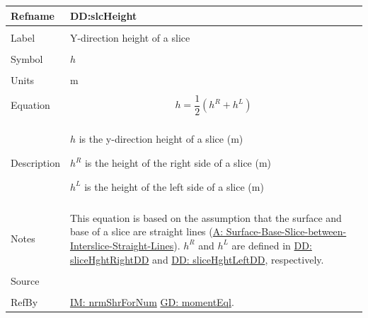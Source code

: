 \documentclass[12pt]{article}
\begin{document}
\noindent \begin{minipage}{\textwidth}
\begin{tabular}{p{} p{}}
\toprule \textbf{Refname} & \textbf{DD:slcHeight}
\label{DD:slcHeight}
\\ \midrule \\
Label & Y-direction height of a slice
        \\ \midrule \\
        Symbol & $h$
                 \\ \midrule \\
                 Units & m
                         \\ \midrule \\
                         Equation & \begin{displaymath}
                                    h=\frac{1}{2} \left({h^{R}}+{h^{L}}\right)
                                    \end{displaymath}
                                    \\ \midrule \\
                                    Description & \begin{symbDescription}
                                                  \item{$h$ is the y-direction height of a slice (m)}
                                                  \item{${h^{R}}$ is the height of the right side of a slice (m)}
                                                  \item{${h^{L}}$ is the height of the left side of a slice (m)}
                                                  \end{symbDescription}
                                                  \\ \midrule \\
                                                  Notes & This equation is based on the assumption that the surface and base of a slice are straight lines (\hyperref[assumpSBSBISL]{A: Surface-Base-Slice-between-Interslice-Straight-Lines}).
                                                          ${h^{R}}$ and ${h^{L}}$ are defined in \hyperref[DD:sliceHghtRightDD]{DD: sliceHghtRightDD} and \hyperref[DD:sliceHghtLeftDD]{DD: sliceHghtLeftDD}, respectively.
                                                          \\ \midrule \\
                                                          Source & \cite{fredlund1977}
                                                                   \\ \midrule \\
                                                                   RefBy & \hyperref[IM:nrmShrForNum]{IM: nrmShrForNum} \hyperref[GD:momentEql]{GD: momentEql}.
\\ \bottomrule \end{tabular}
\end{minipage}
\par~
\end{document}
